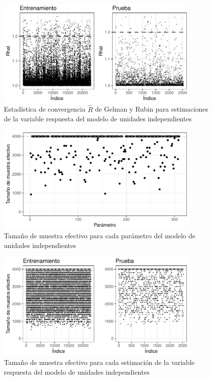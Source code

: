 \begin{figure}[H]
    \centering
    \includegraphics[width=0.9\textwidth]{images/no_pooling_r_statistic_yf.pdf}
    \caption{Estadística de convergencia $\hat{R}$ de Gelman y Rubin para estimaciones de la variable respuesta del modelo de unidades independientes}
    \label{fig:no_pooling_r_statistic_yf}
\end{figure}

\begin{figure}[H]
    \centering
    \includegraphics[width=0.9\textwidth]{images/no_pooling_n_eff_params.pdf}
    \caption{Tamaño de muestra efectivo para cada parámetro del modelo de unidades independientes}
    \label{fig:no_pooling_n_eff_params}
\end{figure}

\begin{figure}[H]
    \centering
    \includegraphics[width=0.9\textwidth]{images/no_pooling_n_eff_yf.pdf}
    \caption{Tamaño de muestra efectivo para cada estimación de la variable respuesta del modelo de unidades independientes}
    \label{fig:no_pooling_n_eff_yf}
\end{figure}




